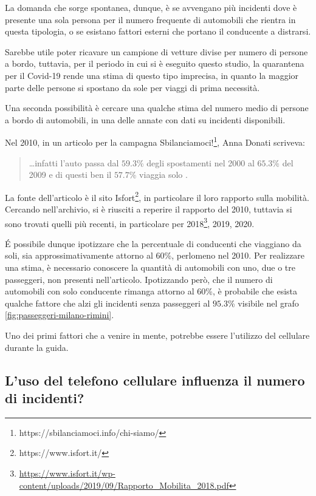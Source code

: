 \documentclass[a4paper,12pt]{report}
\begin{document}
La domanda che sorge spontanea, dunque, è se avvengano più incidenti dove è presente 
una sola persona per il numero frequente di automobili che rientra in questa tipologia, 
o se esistano fattori esterni che portano il conducente a distrarsi.

Sarebbe utile poter ricavare un campione di vetture divise per 
numero di persone a bordo, tuttavia, per il periodo in cui si è eseguito questo 
studio, la quarantena per il Covid-19 rende una stima di questo tipo 
imprecisa, in quanto la maggior parte delle persone si spostano da sole 
per viaggi di prima necessità.

Una seconda possibilità è cercare una qualche stima del numero medio di 
persone a bordo di automobili, in una delle annate con dati su incidenti disponibili.

Nel 2010, in un articolo per la campagna 
Sbilanciamoci!\footnote{https://sbilanciamoci.info/chi-siamo/}, 
Anna Donati scriveva: 

\begin{quotation}
    \dots infatti l’auto passa dal $59.3$\% degli spostamenti nel 2000 al $65.3$\% del 
    2009 e di questi ben il $57.7$\% viaggia solo \cite{SBILANCIAMOCI:1}.
\end{quotation}

La fonte dell'articolo è il sito Isfort\footnote{https://www.isfort.it/}, 
in particolare il loro rapporto sulla mobilità.
Cercando nell'archivio, si è riusciti a reperire il rapporto del 2010, 
tuttavia si sono trovati quelli più recenti, in particolare per 
2018\footnote{\url{https://www.isfort.it/wp-content/uploads/2019/09/Rapporto_Mobilita_2018.pdf}}, 
2019, 2020.

\'E possibile dunque ipotizzare che la percentuale di conducenti che viaggiano 
da soli, sia approssimativamente attorno al $60$\%, perlomeno nel 2010.
Per realizzare una stima, è necessario conoscere la quantità di automobili con uno, 
due o tre passeggeri, non presenti nell'articolo.
Ipotizzando però, che il numero di automobili con solo conducente rimanga attorno al 
$60$\%, è probabile che esista qualche fattore che alzi gli incidenti senza passeggeri al 
$95.3$\% visibile nel grafo \ref{fig:passeggeri-milano-rimini}.

Uno dei primi fattori che a venire in mente, potrebbe 
essere l'utilizzo del cellulare durante la guida.

\subsection{L'uso del telefono cellulare influenza il numero di incidenti?}
\end{document}

